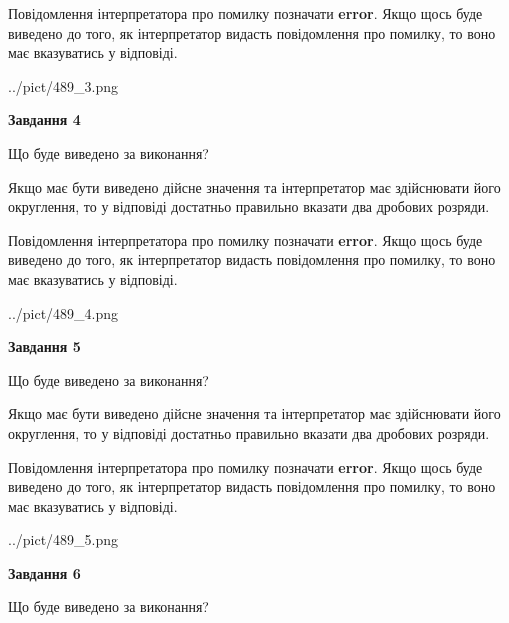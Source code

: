 \documentclass[12pt, ukrainian]{article}
\begin{document}
{\begin {Large}
Повідомлення інтерпретатора про помилку позначати \textbf{error}.
Якщо щось буде виведено до того, як інтерпретатор видасть повідомлення про помилку, 
то воно має вказуватись у відповіді. \par

\begin{center}
	{../pict/489_3.png}
\end{center}
\newpage

{\begin {center}\textbf{Завдання 4}\end {center}}\par
Що буде виведено за виконання? \par

Якщо має бути виведено дійсне значення та інтерпретатор має здійснювати його округлення, 
то у відповіді достатньо правильно вказати два дробових розряди.

Повідомлення інтерпретатора про помилку позначати \textbf{error}.
Якщо щось буде виведено до того, як інтерпретатор видасть повідомлення про помилку, 
то воно має вказуватись у відповіді. \par

\begin{center}
	{../pict/489_4.png}
\end{center}
\newpage

{\begin {center}\textbf{Завдання 5}\end {center}}\par
Що буде виведено за виконання? \par

Якщо має бути виведено дійсне значення та інтерпретатор має здійснювати його округлення, 
то у відповіді достатньо правильно вказати два дробових розряди.

Повідомлення інтерпретатора про помилку позначати \textbf{error}.
Якщо щось буде виведено до того, як інтерпретатор видасть повідомлення про помилку, 
то воно має вказуватись у відповіді. \par

\begin{center}
	{../pict/489_5.png}
\end{center}
\newpage

{\begin {center}\textbf{Завдання 6}\end {center}}\par
Що буде виведено за виконання? \par


\end{Large}}
\end{document}
